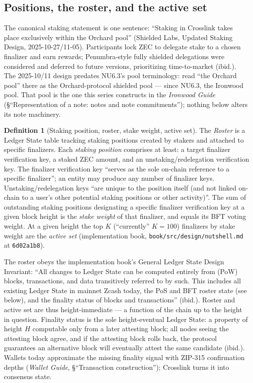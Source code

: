 \documentclass[11pt,a4paper]{article}
\theoremstyle{definition}
\newtheorem{definition}[theorem]{Definition}
\begin{document}
\subsection{Positions, the roster, and the active set}
\label{sec:xl-stake-roster}

The canonical staking statement is one sentence: ``Staking in Crosslink
takes place exclusively within the Orchard pool'' (Shielded Labs, Updated
Staking Design, 2025-10-27/11-05). Participants lock ZEC to delegate stake
to a chosen finalizer and earn rewards; Penumbra-style fully shielded
delegations were considered and deferred to future versions, prioritizing
time-to-market (ibid.). The 2025-10/11 design predates NU6.3's pool
terminology: read ``the Orchard pool'' there as the Orchard-protocol
shielded pool --- since NU6.3, the Ironwood pool. That pool is the one this
series constructs in the \emph{Ironwood Guide} (\S``Representation of a
note: notes and note commitments''); nothing below alters its note
machinery.

\begin{definition}[Staking position, roster, stake weight, active set]
\label{def:xl-roster}
The \emph{Roster} is a Ledger State table tracking staking positions
created by stakers and attached to specific finalizers. Each
\emph{staking position} comprises at least: a target finalizer
verification key, a staked ZEC amount, and an unstaking/redelegation
verification key. The finalizer verification key ``serves as the sole
on-chain reference to a specific finalizer''; an entity may produce any
number of finalizer keys. Unstaking/redelegation keys ``are unique to the
position itself (and not linked on-chain to a user's other potential
staking positions or other activity)''. The sum of outstanding staking
positions designating a specific finalizer verification key at a given
block height is the \emph{stake weight} of that finalizer, and equals its
BFT voting weight. At a given height the top $K$ (``currently'' $K = 100$)
finalizers by stake weight are the \emph{active set} (implementation book,
\texttt{book/src/design/nutshell.md} at \texttt{6d02a1b8}).
\end{definition}

The roster obeys the implementation book's General Ledger State Design
Invariant: ``All changes to Ledger State can be computed entirely from
(PoW) blocks, transactions, and data transitively referred to by such.
This includes all existing Ledger State in mainnet Zcash today, the PoS
and BFT roster state (see below), and the finality status of blocks and
transactions'' (ibid.). Roster and active set are thus height-immediate
--- a function of the chain up to the height in question. Finality status
is the sole height-eventual Ledger State: a property of height $H$
computable only from a later attesting block; all nodes seeing the
attesting block agree, and if the attesting block rolls back, the protocol
guarantees an alternative block will eventually attest the same candidate
(ibid.). Wallets today approximate the missing finality signal with
ZIP-315 confirmation depths (\emph{Wallet Guide}, \S``Transaction
construction''); Crosslink turns it into consensus state.
\end{document}
